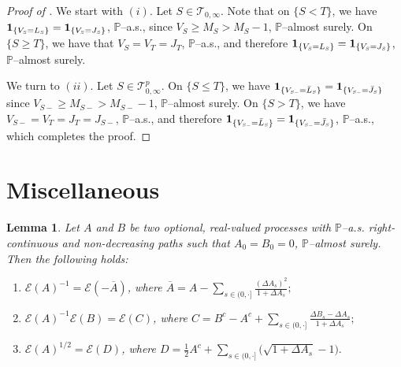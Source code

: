 \documentclass[10pt]{article} %
\newtheorem{lemma}[theorem]{Lemma}
\newcommand\cE{\mathcal E}
\newcommand\cT{\mathcal T}
\newcommand{\smalltext}[1]{\text{\fontsize{4}{4}\selectfont$#1$}}
\def \P{\mathbb{P}}
\begin{document}
\begin{proof}[Proof of ]
	We start with $(i)$. Let $S \in \cT_{0,\infty}$. Note that on $\{S < T\}$, we have $\mathbf{1}_{\{V_\smalltext{S} = L_\smalltext{S}\}} = \mathbf{1}_{\{V_\smalltext{S} = J_\smalltext{S}\}}$, $\P$--a.s., since $V_S \geq M_S > M_S - 1$, $\P$--almost surely. On $\{S \geq T\}$, we have that $V_S = V_T = J_T$, $\P$--a.s., and therefore $\mathbf{1}_{\{V_\smalltext{S} = L_\smalltext{S}\}}= \mathbf{1}_{\{V_\smalltext{S} = J_\smalltext{S}\}}$, $\P$--almost surely. 
	
	\medskip
	We turn to $(ii)$. Let $S \in \cT^p_{0,\infty}$. On $\{S \leq T\}$, we have $\mathbf{1}_{\{V_{\smalltext{S}\smalltext{-}} = \bar L_\smalltext{S}\}} = \mathbf{1}_{\{V_{\smalltext{S}\smalltext{-}}=\bar J_\smalltext{S}\}}$ since $V_{S-} \geq M_{S-} > M_{S-} - 1$, $\P$--almost surely. On $\{S > T\}$, we have $V_{S-} = V_T = J_T = J_{S-}$, $\P$--a.s., and therefore $\mathbf{1}_{\{V_{\smalltext{S}\smalltext{-}} = \bar L_\smalltext{S}\}} = \mathbf{1}_{\{V_{\smalltext{S}\smalltext{-}}=\bar J_\smalltext{S}\}}$, $\P$--a.s., which completes the proof.
\end{proof}

\section{Miscellaneous}

\begin{lemma}\label{lem::stoch_exp_rules}
	Let $A$ and $B$ be two optional, real-valued processes with $\P$--{\rm a.s.} right-continuous and non-decreasing paths such that $A_0 = B_0 = 0$, $\P$--almost surely. Then the following holds:
	\begin{enumerate}
		\item[$(i)$] $\cE(A)^{-1} = \cE(-\overline A)$, where $\overline A = A - \sum_{s \in (0,\cdot]} \frac{(\Delta A_s)^2}{1+\Delta A_s};$
		\item[$(ii)$] $\cE(A)^{-1}\cE(B) = \cE(C)$, where $C = B^c - A^c + \sum_{s \in (0,\cdot]} \frac{\Delta B_s - \Delta A_s}{1+\Delta A_s};$
		\item[$(iii)$] $\cE(A)^{1/2} = \cE(D)$, where $D = \frac{1}{2} A^c + \sum_{s \in (0,\cdot]} \big(\sqrt{1+\Delta A_s}-1\big).$
	\end{enumerate}
\end{lemma}
\end{document}
